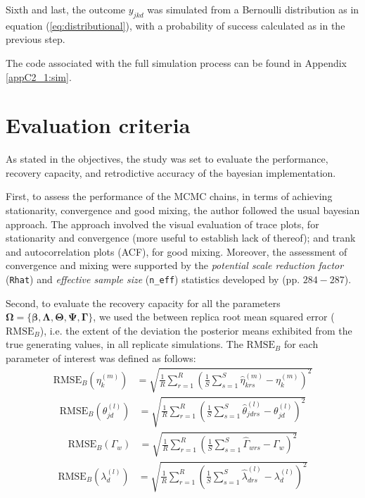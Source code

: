 Sixth and last, the outcome $y_{jkd}$ was simulated from a Bernoulli distribution as in equation (\ref{eq:distributional}), with a probability of success calculated as in the previous step. 

The code associated with the full simulation process can be found in Appendix \ref{appC2_1:sim}.


\section{Evaluation criteria}

As stated in the objectives, the study was set to evaluate the performance, recovery capacity, and retrodictive accuracy of the bayesian implementation.

First, to assess the performance of the MCMC chains, in terms of achieving stationarity, convergence and good mixing, the author followed the usual bayesian approach. The approach involved the visual evaluation of trace plots, for stationarity and convergence (more useful to establish lack of thereof); and trank and autocorrelation plots (ACF), for good mixing. Moreover, the assessment of convergence and mixing were supported by the \textit{potential scale reduction factor} (\texttt{Rhat}) and \textit{effective sample size} (\texttt{n\_eff}) statistics developed by \citet{Gelman_et_al_2014} (pp. $284-287$).

Second, to evaluate the recovery capacity for all the parameters $\pmb{\Omega} = \{ \pmb{\beta}, \pmb{\Lambda}, \pmb{\Theta}, \pmb{\Psi}, \pmb{\Gamma} \}$, we used the between replica root mean squared error ($\text{RMSE}_{B}$), i.e. the extent of the deviation the posterior means exhibited from the true generating values, in all replicate simulations. The $\text{RMSE}_{B}$ for each parameter of interest was defined as follows:
%
\begin{align}
	\text{RMSE}_{B} \left( \eta^{(m)}_{k} \right) &=\sqrt{\frac{1}{R} \sum_{r=1}^{R} \left( \frac{1}{S} \sum_{s=1}^{S} \hat{\eta}^{(m)}_{krs} - \eta^{(m)}_{k} \right)^2}
\end{align}
%
\begin{align}
	\text{RMSE}_{B} \left( \theta^{(l)}_{jd} \right) &=\sqrt{\frac{1}{R} \sum_{r=1}^{R} \left( \frac{1}{S} \sum_{s=1}^{S} \hat{\theta}^{(l)}_{jdrs} - \theta^{(l)}_{jd} \right)^2} 
\end{align}
%
\begin{align}
	\text{RMSE}_{B} \left( \Gamma_{w} \right) &=\sqrt{\frac{1}{R} \sum_{r=1}^{R} \left( \frac{1}{S} \sum_{s=1}^{S} \hat{\Gamma}_{wrs} - \Gamma_{w} \right)^2}
\end{align}
%
\begin{align}
	\text{RMSE}_{B} \left( \lambda^{(l)}_{d} \right) &=\sqrt{\frac{1}{R} \sum_{r=1}^{R} \left( \frac{1}{S} \sum_{s=1}^{S} \hat{\lambda}^{(l)}_{drs} - \lambda^{(l)}_{d} \right)^2}
\end{align}

